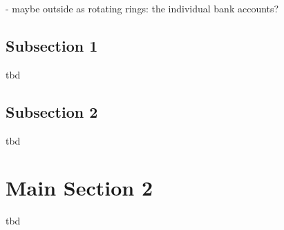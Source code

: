 - maybe outside as rotating rings: the individual bank accounts?




\subsection{Subsection 1}

tbd



\subsection{Subsection 2}

tbd



\section{Main Section 2}

tbd